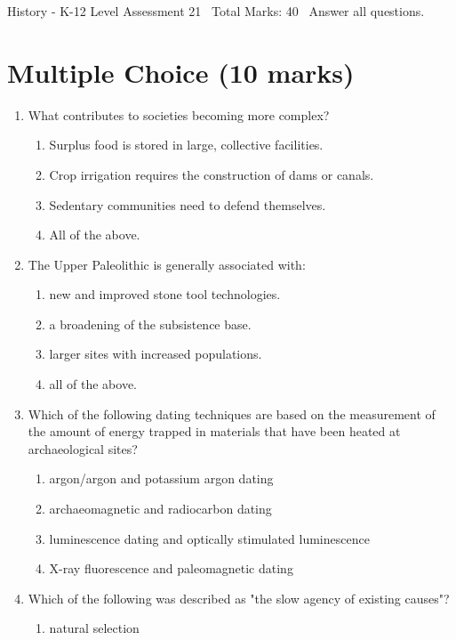 \documentclass[12pt]{article}
\begin{document}
\begin{center}
History - K-12 Level Assessment 21 \
Total Marks: 40 \
Answer all questions.
\end{center}

\section*{Multiple Choice (10 marks)}
\begin{enumerate}[label=\arabic*.]
\item What contributes to societies becoming more complex?
\begin{enumerate}[label=(\alph*)]
    \item Surplus food is stored in large, collective facilities.
    \item Crop irrigation requires the construction of dams or canals.
    \item Sedentary communities need to defend themselves.
    \item All of the above.
\end{enumerate}
\item The Upper Paleolithic is generally associated with:
\begin{enumerate}[label=(\alph*)]
    \item new and improved stone tool technologies.
    \item a broadening of the subsistence base.
    \item larger sites with increased populations.
    \item all of the above.
\end{enumerate}
\item Which of the following dating techniques are based on the measurement of the amount of energy trapped in materials that have been heated at archaeological sites?
\begin{enumerate}[label=(\alph*)]
    \item argon/argon and potassium argon dating
    \item archaeomagnetic and radiocarbon dating
    \item luminescence dating and optically stimulated luminescence
    \item X-ray fluorescence and paleomagnetic dating
\end{enumerate}
\item Which of the following was described as "the slow agency of existing causes"?
\begin{enumerate}[label=(\alph*)]
    \item natural selection

\end{enumerate}
\end{enumerate}
\end{document}
